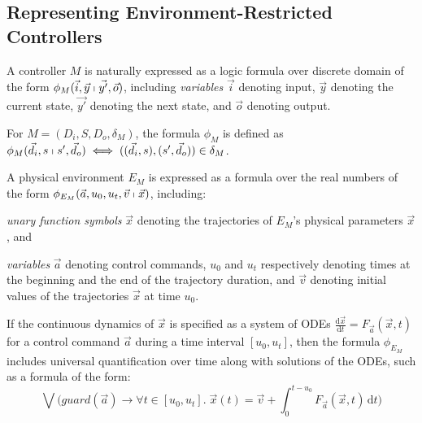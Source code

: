 \subsection{Representing Environment-Restricted Controllers}
\label{sec:discrete-encoding}

A controller $M$ is naturally 
expressed as a logic formula over discrete domain
of the form $\phi_M(\vec{i}, \vec{y} \shortmid \vec{y'}, \vec{o})$,
including \emph{variables}
$\vec{i}$ denoting input, 
$\vec{y}$ denoting the current state, 
$\vec{y'}$ denoting the next state, and 
$\vec{o}$  denoting output.

\begin{definition}
For  $M = (D_i,S,D_o,\delta_M)$,
the formula $\phi_M$ is defined as
$\phi_{M}(\vec{d}_i, s \shortmid s',  \vec{d}_o)
\iff
( (\vec{d}_i, s), (s', \vec{d}_o) ) \in \delta_{M}$.
\end{definition}



A physical environment $E_M$ is expressed as 
a formula over the real numbers %
of the form $\phi_{E_M}(\vec{a},u_0,u_t,\vec{v} \shortmid \vec{x})$,
including: \begin{inparaenum}[(i)]
	\item \emph{unary function symbols} $\vec{x}$ denoting the trajectories of $E_M$'s physical parameters $\vec{x}$,
	and
	\item \emph{variables} $\vec{a}$ denoting control commands, %
		$u_0$ and $u_t$ respectively denoting 
		times at the beginning and the end of the trajectory duration, and 
		$\vec{v}$ denoting initial values of the trajectories $\vec{x}$ at time $u_0$.
\end{inparaenum}


If the continuous dynamics of $\vec{x}$ is specified as a system of ODEs
$\frac{\mathrm{d}\vec{x}}{\mathrm{d}t}= F_{\vec{a}}(\vec{x},t)$
for a control command $\vec{a}$
during a time interval $[u_0,u_t]$, 
then the formula $\phi_{E_M}$ 
includes universal quantification over time along with solutions of the ODEs, such as a formula of the form:
\[
\bigvee \big(\mathit{guard}(\vec{a}) \rightarrow
\forall t \in [u_0,u_t].\;
\vec{x}(t) = \vec{v} + \int_0^{t-u_0} \!  F_{\vec{a}}(\vec{x},t)\,\mathrm{d}t
\big)
\]


